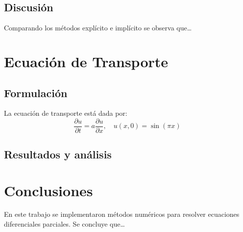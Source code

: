 \documentclass[12pt,a4paper]{article}
\begin{document}
\subsection{Discusión}
Comparando los métodos explícito e implícito se observa que\ldots

\section{Ecuación de Transporte}
\subsection{Formulación}
La ecuación de transporte está dada por:
\begin{equation}
    \frac{\partial u}{\partial t} = a \frac{\partial u}{\partial x}, \quad
    u(x,0) = \sin(\pi x)
\end{equation}

\subsection{Resultados y análisis}

\section{Conclusiones}
En este trabajo se implementaron métodos numéricos para resolver ecuaciones diferenciales parciales. 
Se concluye que\ldots
\end{document}

